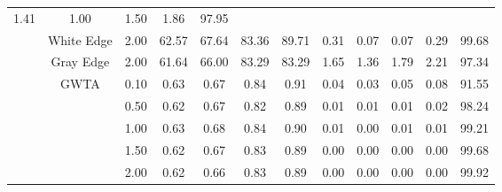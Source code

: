 \begin{table}[htbp]
{\begin{tabular}{cc|c|ccccccccc}
  \multicolumn{1}{c|}{1.41} &
  \multicolumn{1}{c|}{1.00} &
  \multicolumn{1}{c|}{1.50} &
  \multicolumn{1}{c|}{1.86} &
  97.95 \\ \cline{2-12} 
\multicolumn{1}{c|}{} &
  White Edge &
  2.00 &
  \multicolumn{1}{c|}{62.57} &
  \multicolumn{1}{c|}{67.64} &
  \multicolumn{1}{c|}{83.36} &
  \multicolumn{1}{c|}{89.71} &
  \multicolumn{1}{c|}{0.31} &
  \multicolumn{1}{c|}{0.07} &
  \multicolumn{1}{c|}{0.07} &
  \multicolumn{1}{c|}{0.29} &
  99.68 \\ \cline{2-12} 
\multicolumn{1}{c|}{} &
  Gray Edge &
  2.00 &
  \multicolumn{1}{c|}{61.64} &
  \multicolumn{1}{c|}{66.00} &
  \multicolumn{1}{c|}{83.29} &
  \multicolumn{1}{c|}{83.29} &
  \multicolumn{1}{c|}{1.65} &
  \multicolumn{1}{c|}{1.36} &
  \multicolumn{1}{c|}{1.79} &
  \multicolumn{1}{c|}{2.21} &
  97.34 \\ \cline{2-12} 
\multicolumn{1}{c|}{} &
  \multirow{9}{*}{GWTA} &
  0.10 &
  \multicolumn{1}{c|}{0.63} &
  \multicolumn{1}{c|}{0.67} &
  \multicolumn{1}{c|}{0.84} &
  \multicolumn{1}{c|}{0.91} &
  \multicolumn{1}{c|}{0.04} &
  \multicolumn{1}{c|}{0.03} &
  \multicolumn{1}{c|}{0.05} &
  \multicolumn{1}{c|}{0.08} &
  91.55 \\ \cline{3-12} 
\multicolumn{1}{c|}{} &
   &
  0.50 &
  \multicolumn{1}{c|}{0.62} &
  \multicolumn{1}{c|}{0.67} &
  \multicolumn{1}{c|}{0.82} &
  \multicolumn{1}{c|}{0.89} &
  \multicolumn{1}{c|}{0.01} &
  \multicolumn{1}{c|}{0.01} &
  \multicolumn{1}{c|}{0.01} &
  \multicolumn{1}{c|}{0.02} &
  98.24 \\ \cline{3-12} 
\multicolumn{1}{c|}{} &
   &
  1.00 &
  \multicolumn{1}{c|}{0.63} &
  \multicolumn{1}{c|}{0.68} &
  \multicolumn{1}{c|}{0.84} &
  \multicolumn{1}{c|}{0.90} &
  \multicolumn{1}{c|}{0.01} &
  \multicolumn{1}{c|}{0.00} &
  \multicolumn{1}{c|}{0.01} &
  \multicolumn{1}{c|}{0.01} &
  99.21 \\ \cline{3-12} 
\multicolumn{1}{c|}{} &
   &
  1.50 &
  \multicolumn{1}{c|}{0.62} &
  \multicolumn{1}{c|}{0.67} &
  \multicolumn{1}{c|}{0.83} &
  \multicolumn{1}{c|}{0.89} &
  \multicolumn{1}{c|}{0.00} &
  \multicolumn{1}{c|}{0.00} &
  \multicolumn{1}{c|}{0.00} &
  \multicolumn{1}{c|}{0.00} &
  99.68 \\ \cline{3-12} 
\multicolumn{1}{c|}{} &
   &
  2.00 &
  \multicolumn{1}{c|}{0.62} &
  \multicolumn{1}{c|}{0.66} &
  \multicolumn{1}{c|}{0.83} &
  \multicolumn{1}{c|}{0.89} &
  \multicolumn{1}{c|}{0.00} &
  \multicolumn{1}{c|}{0.00} &
  \multicolumn{1}{c|}{0.00} &
  \multicolumn{1}{c|}{0.00} &
  99.92 \\ \cline{3-12} 

\end{tabular}}
\end{table}
